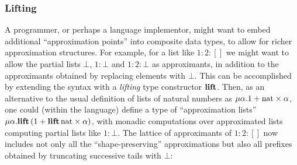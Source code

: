 \subsubsection{Lifting}

A programmer, or perhaps a language implementor, might want to embed additional ``approximation points'' into
composite data types, to allow for richer approximation structures. For example, for a list like $1 : 2 : []$
we might want to allow the partial lists $\bot$, $1 : \bot$ and $1 : 2 : \bot$ as approximants, in addition to
the approximants obtained by replacing elements with $\bot$. This can be accomplished by extending the syntax
with a \emph{lifting} type constructor $\mathbf{lift}$. Then, as an alternative to the usual definition of lists of
natural numbers as $\mu\alpha.1 + \mathrm{nat} \times \alpha$, one could (within the language) define a type
of ``approximation lists'' $\mu\alpha.\mathbf{lift}\,(1 + \mathbf{lift}\,\mathrm{nat} \times \alpha)$, with monadic
computations over approximated lists computing partial lists like $1 : \bot$. The lattice of approximants of
$1 : 2 : []$ now includes not only all the ``shape-preserving'' approximations but also all prefixes obtained
by truncating successive tails with $\bot$:

  \begin{center}
    \tikzset{node distance=1cm}
  \end{center}

